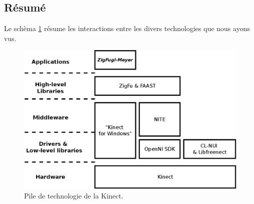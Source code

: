 
\subsection{Résumé}
Le schèma \ref{fig:technology_overview} résume les interactions entre les divers 
technologies que nous ayons vus.

\begin{figure}[h!]
\centering
\includegraphics[width=0.9\linewidth]{images/technology_overview}
\caption{Pile de technologie de la Kinect.}
\label{fig:technology_overview}
\end{figure}